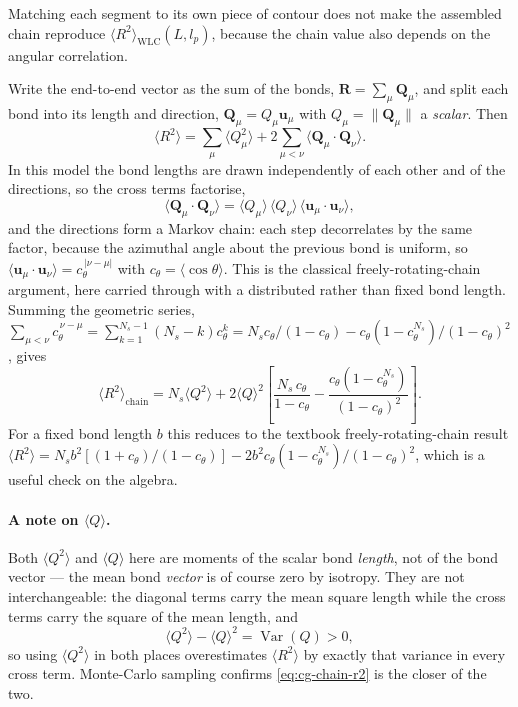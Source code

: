 \documentclass[11pt,a4paper]{report}
\newcommand{\uv}{\bm{u}}
\begin{document}
Matching each segment to its own piece of contour does not make the assembled
chain reproduce $\langle R^{2}\rangle_{\mathrm{WLC}}(L,l_p)$, because the chain
value also depends on the angular correlation.

Write the end-to-end vector as the sum of the bonds, $\bm{R} = \sum_\mu\bm{Q}_\mu$,
and split each bond into its length and direction, $\bm{Q}_\mu = Q_\mu\uv_\mu$
with $Q_\mu = \|\bm{Q}_\mu\|$ a \emph{scalar}. Then
\begin{equation}
  \langle R^{2}\rangle = \sum_\mu \langle Q_\mu^{2}\rangle
    + 2\sum_{\mu<\nu}\langle \bm{Q}_\mu\cdot\bm{Q}_\nu\rangle .
\end{equation}
In this model the bond lengths are drawn independently of each other and of the
directions, so the cross terms factorise,
\begin{equation}
  \langle \bm{Q}_\mu\cdot\bm{Q}_\nu\rangle
    = \langle Q_\mu\rangle\,\langle Q_\nu\rangle\,\langle \uv_\mu\cdot\uv_\nu\rangle ,
\end{equation}
and the directions form a Markov chain: each step decorrelates by the same factor,
because the azimuthal angle about the previous bond is uniform, so
$\langle\uv_\mu\cdot\uv_\nu\rangle = c_\theta^{\,|\nu-\mu|}$ with
$c_\theta = \langle\cos\theta\rangle$. This is the classical freely-rotating-chain
argument, here carried through with a distributed rather than fixed bond length.
Summing the geometric series,
$\sum_{\mu<\nu}c_\theta^{\,\nu-\mu} = \sum_{k=1}^{N_s-1}(N_s-k)c_\theta^{k}
 = N_s c_\theta/(1-c_\theta) - c_\theta(1-c_\theta^{N_s})/(1-c_\theta)^{2}$,
gives
\begin{equation}
  \langle R^{2}\rangle_{\mathrm{chain}}
    = N_s\langle Q^{2}\rangle
    + 2\langle Q\rangle^{2}\left[
        \frac{N_s\,c_\theta}{1-c_\theta}
        - \frac{c_\theta\left(1-c_\theta^{N_s}\right)}{(1-c_\theta)^{2}}\right].
  \label{eq:cg-chain-r2}
\end{equation}
For a fixed bond length $b$ this reduces to the textbook freely-rotating-chain
result $\langle R^{2}\rangle = N_s b^{2}\left[(1+c_\theta)/(1-c_\theta)\right]
- 2b^{2}c_\theta(1-c_\theta^{N_s})/(1-c_\theta)^{2}$, which is a useful check on
the algebra.

\paragraph{A note on $\langle Q\rangle$.} Both $\langle Q^{2}\rangle$ and
$\langle Q\rangle$ here are moments of the scalar bond \emph{length}, not of the
bond vector --- the mean bond \emph{vector} is of course zero by isotropy. They are
not interchangeable: the diagonal terms carry the mean square length while the
cross terms carry the square of the mean length, and
\begin{equation}
  \langle Q^{2}\rangle - \langle Q\rangle^{2} = \operatorname{Var}(Q) > 0 ,
\end{equation}
so using $\langle Q^{2}\rangle$ in both places overestimates $\langle
R^{2}\rangle$ by exactly that variance in every cross term. Monte-Carlo sampling
confirms \eqref{eq:cg-chain-r2} is the closer of the two.
\end{document}
